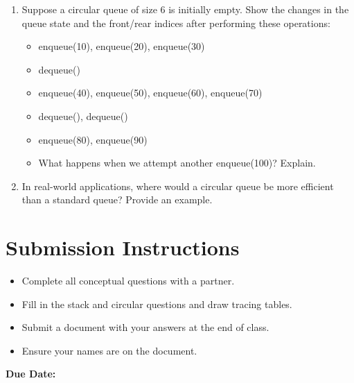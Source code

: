 \documentclass[12pt]{article}
\begin{document}
\begin{enumerate}
    \item Suppose a circular queue of size 6 is initially empty. Show the changes in the queue state and the front/rear indices after performing these operations:
    \begin{itemize}
        \item enqueue(10), enqueue(20), enqueue(30)
        \item dequeue()
        \item enqueue(40), enqueue(50), enqueue(60), enqueue(70)
        \item dequeue(), dequeue()
        \item enqueue(80), enqueue(90)
        \item What happens when we attempt another enqueue(100)? Explain.
    \end{itemize}
    
    \vspace{3cm}
    
    \item In real-world applications, where would a circular queue be more efficient than a standard queue? Provide an example.
    
    \vspace{3cm}
\end{enumerate}

\section*{Submission Instructions}
\begin{itemize}
    \item Complete all conceptual questions with a partner.
    \item Fill in the stack and circular questions and draw tracing tables.
    \item Submit a document with your answers at the end of class.
    \item Ensure your names are on the document.
\end{itemize}

\textbf{Due Date:} \underline{\hspace{6cm}}
\end{document}

